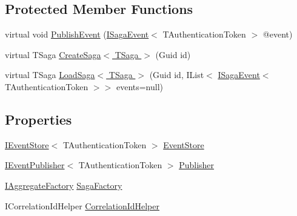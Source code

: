 \subsection*{Protected Member Functions}
\begin{DoxyCompactItemize}
\item 
virtual void \hyperlink{classCqrs_1_1Domain_1_1SagaRepository_a1dec03959e4d859c6cf2be0507b1bc05_a1dec03959e4d859c6cf2be0507b1bc05}{Publish\+Event} (\hyperlink{interfaceCqrs_1_1Events_1_1ISagaEvent}{I\+Saga\+Event}$<$ T\+Authentication\+Token $>$ @event)
\item 
virtual T\+Saga \hyperlink{classCqrs_1_1Domain_1_1SagaRepository_acb23e0bd3e5655547a13b4ad2b06e548_acb23e0bd3e5655547a13b4ad2b06e548}{Create\+Saga$<$ T\+Saga $>$} (Guid id)
\item 
virtual T\+Saga \hyperlink{classCqrs_1_1Domain_1_1SagaRepository_acc59a4478bb992b03690f0cda3e4e362_acc59a4478bb992b03690f0cda3e4e362}{Load\+Saga$<$ T\+Saga $>$} (Guid id, I\+List$<$ \hyperlink{interfaceCqrs_1_1Events_1_1ISagaEvent}{I\+Saga\+Event}$<$ T\+Authentication\+Token $>$$>$ events=null)
\end{DoxyCompactItemize}
\subsection*{Properties}
\begin{DoxyCompactItemize}
\item 
\hyperlink{interfaceCqrs_1_1Events_1_1IEventStore}{I\+Event\+Store}$<$ T\+Authentication\+Token $>$ \hyperlink{classCqrs_1_1Domain_1_1SagaRepository_a4b872f1a20660ece8ce1b54720193fda_a4b872f1a20660ece8ce1b54720193fda}{Event\+Store}
\item 
\hyperlink{interfaceCqrs_1_1Events_1_1IEventPublisher}{I\+Event\+Publisher}$<$ T\+Authentication\+Token $>$ \hyperlink{classCqrs_1_1Domain_1_1SagaRepository_a94707dc4549d096ea3cf5d241117495a_a94707dc4549d096ea3cf5d241117495a}{Publisher}
\item 
\hyperlink{interfaceCqrs_1_1Domain_1_1Factories_1_1IAggregateFactory}{I\+Aggregate\+Factory} \hyperlink{classCqrs_1_1Domain_1_1SagaRepository_a578164fa38728f3a23ca41d8c81611e0_a578164fa38728f3a23ca41d8c81611e0}{Saga\+Factory}
\item 
I\+Correlation\+Id\+Helper \hyperlink{classCqrs_1_1Domain_1_1SagaRepository_a654f9f7c2130864d63515f1504a750fd_a654f9f7c2130864d63515f1504a750fd}{Correlation\+Id\+Helper}
\end{DoxyCompactItemize}


